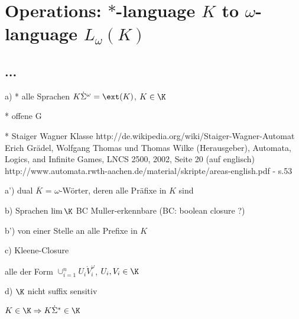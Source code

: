\section{Operations: $*$-language $K$ to $\omega$-language $L_\omega (K)$}
\subsection{...}
a)
* alle Sprachen $K \dot \Sigma^\omega = \ext(K)$, $K \in \K$

* offene G

* Staiger Wagner Klasse
http://de.wikipedia.org/wiki/Staiger-Wagner-Automat
Erich Grädel, Wolfgang Thomas und Thomas Wilke (Herausgeber), Automata, Logics, and Infinite Games, LNCS 2500, 2002, Seite 20 (auf englisch)
http://www.automata.rwth-aachen.de/material/skripte/areas-english.pdf - s.53

a')
dual $\overline{K}$ = $\omega$-Wörter, deren alle Präfixe in $K$ sind

b) Sprachen $\lim \K$
BC Muller-erkennbare
(BC: boolean closure ?)

b') von einer Stelle an alle Prefixe in $K$

c) Kleene-Closure

alle der Form $\cup_{i=1}^n U_i \dot V_i^\omega$, $U_i, V_i \in \K$

d) $\K$ nicht suffix sensitiv

$K \in \K \Rightarrow K \dot \Sigma^* \in \K$  

